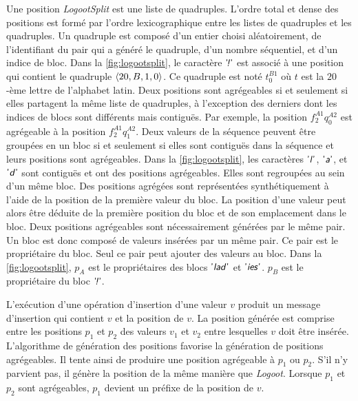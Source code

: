 Une position \emph{LogootSplit} est une liste de quadruples.
L'ordre total et dense des positions est formé par l'ordre lexicographique entre les listes de quadruples et les quadruples.
Un quadruple est composé d'un entier choisi aléatoirement, de l'identifiant du pair qui a généré le quadruple, d'un nombre séquentiel, et d'un indice de bloc.
Dans la \autoref{fig:logootsplit}, le caractère $\textsf{'\textit{\negthinspace!}'}$ est associé à une position qui contient le quadruple $\langle20, B, 1, 0\rangle$.
Ce quadruple est noté $t^{B1}_0$ où $t$ est la $20$-ème lettre de l'alphabet latin.
Deux positions sont agrégeables si et seulement si elles partagent la même liste de quadruples, à l'exception des derniers dont les indices de blocs sont différents mais contiguës.
Par exemple, la position $f^{A1}_2q^{A2}_0$ est agrégeable à la position $f^{A1}_2q^{A2}_1$.
Deux valeurs de la séquence peuvent être groupées en un bloc si et seulement si elles sont contiguës dans la séquence et leurs positions sont agrégeables.
Dans la \autoref{fig:logootsplit}, les caractères $\textsf{'\textit{l}'}$, $\textsf{'\textit{a}'}$, et $\textsf{'\textit{d}'}$ sont contiguës et ont des positions agrégeables.
Elles sont regroupées au sein d'un même bloc.
Des positions agrégées sont représentées synthétiquement à l'aide de la position de la première valeur du bloc.
La position d'une valeur peut alors être déduite de la première position du bloc et de son emplacement dans le bloc.
Deux positions agrégeables sont nécessairement générées par le même pair.
Un bloc est donc composé de valeurs insérées par un même pair.
Ce pair est le propriétaire du bloc.
Seul ce pair peut ajouter des valeurs au bloc.
Dans la \autoref{fig:logootsplit}, $p_A$ est le propriétaires des blocs $\textsf{'\textit{lad}'}$ et $\textsf{'\textit{ies}'}$.
$p_B$ est le propriétaire du bloc $\textsf{'\textit{\negthinspace!}'}$.

L'exécution d'une opération d'insertion d'une valeur $v$ produit un message d'insertion qui contient $v$ et la position de $v$.
La position générée est comprise entre les positions $p_1$ et $p_2$ des valeurs $v_1$ et $v_2$ entre lesquelles $v$ doit être insérée.
L'algorithme de génération des positions favorise la génération de positions agrégeables.
Il tente ainsi de produire une position agrégeable à $p_1$ ou $p_2$.
S'il n'y parvient pas, il génère la position de la même manière que \emph{Logoot}.
Lorsque $p_1$ et $p_2$ sont agrégeables, $p_1$ devient un préfixe de la position de $v$.

